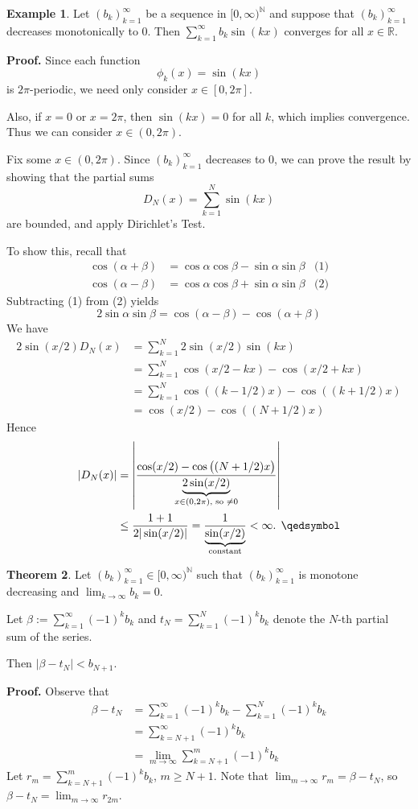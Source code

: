 \documentclass[11pt]{article}
\theoremstyle{definition}
\newtheorem{thm}{Theorem}[section]
\newtheorem{exmp}[thm]{Example}
\newcommand{\mbN}{\ensuremath{\mathbb{N}}}
\newcommand{\mbR}{\ensuremath{\mathbb{R}}}
\begin{document}
\begin{exmp}
Let $(b_k)_{k=1}^\infty$ be a sequence in $[0, \infty)^\mbN$ and suppose that $(b_k)_{k=1}^\infty$ decreases monotonically to 0. 
Then $\sum_{k=1}^\infty b_k \sin(kx)$ converges for all $x \in \mbR$.
\end{exmp}
\textbf{Proof.} Since each function
$$\phi_k(x) = \sin(kx)$$
is $2\pi$-periodic, we need only consider $x \in [0, 2\pi]$. 

Also, if $x = 0$ or $x = 2\pi$, then $\sin(kx) = 0$ for all $k$, which implies convergence. Thus we can consider $x \in (0, 2\pi)$. 

Fix some $x \in (0, 2\pi)$. Since $(b_k)_{k=1}^\infty$ decreases to 0, we can prove the result by showing that the partial sums
$$D_N(x) = \sum_{k=1}^N \sin(kx)$$
are bounded, and apply Dirichlet's Test.

To show this, recall that
\begin{align*}
\cos(\alpha + \beta) & = \cos\alpha\cos\beta - \sin\alpha\sin\beta & \text{(1)} \\
\cos(\alpha - \beta) & = \cos\alpha\cos\beta + \sin\alpha\sin\beta & \text{(2)}
\end{align*}
Subtracting (1) from (2) yields
$$2\sin\alpha\sin\beta = \cos(\alpha - \beta) - \cos(\alpha + \beta)$$
We have
\begin{align*}
2\sin(x/2)D_N(x) & = \sum_{k=1}^N 2\sin(x/2)\sin(kx) \\
& = \sum_{k=1}^N \cos(x/2 - kx) - \cos(x/2 + kx) \\
& = \sum_{k=1}^N \cos \left( (k-1/2)x \right) - \cos \left( (k+1/2)x \right) \\
& = \cos(x/2) - \cos\left((N+1/2)x\right)
\end{align*}
Hence
\begin{align*}
|D_N(x)| & = \left| \frac{\cos(x/2) - \cos\left((N+1/2)x\right)}{\underbrace{2\sin(x/2)}_{x\in(0, 2\pi), \text{ so } \ne 0}} \right| \\
& \leq \frac{1+1}{2|\sin(x/2)|} = \frac{1}{\underbrace{\sin(x/2)}_{\text{constant}}} < \infty \text{. } \qedsymbol
\end{align*}

\begin{thm}
Let $(b_k)_{k=1}^\infty \in [0, \infty)^\mbN$ such that $(b_k)_{k=1}^\infty$ is monotone decreasing and $\lim_{k\to\infty} b_k = 0$. 

Let $\beta := \sum_{k=1}^\infty (-1)^k b_k$ and $t_N = \sum_{k=1}^N (-1)^k b_k$ denote the $N$-th partial sum of the series. 

Then $|\beta - t_N| < b_{N+1}$.
\end{thm}
\textbf{Proof.} Observe that
\begin{align*}
\beta - t_N & = \sum_{k=1}^\infty (-1)^k b_k - \sum_{k=1}^N (-1)^k b_k \\
& = \sum_{k=N+1}^\infty (-1)^k b_k \\
& = \lim_{m\to\infty} \sum_{k=N+1}^m (-1)^k b_k
\end{align*}
Let $r_m = \sum_{k=N+1}^m (-1)^k b_k$, $m \geq N+1$. Note that $\lim_{m\to\infty} r_m = \beta - t_N$, so $\beta - t_N = \lim_{m\to\infty} r_{2m}$. 
\end{document}
